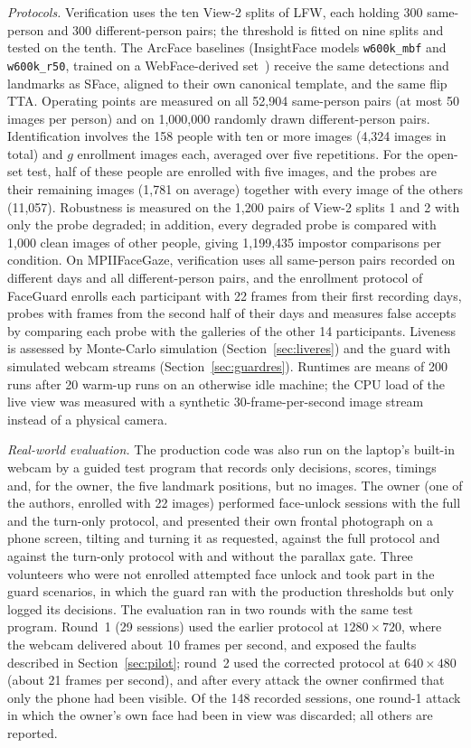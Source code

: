 \documentclass{ieeeaccess}
\begin{document}
\emph{Protocols.} Verification uses the ten View-2 splits of LFW, each holding 300 same-person and 300 different-person pairs; the threshold is fitted on nine splits and tested on the tenth. The ArcFace baselines (InsightFace models \texttt{w600k\_mbf} and \texttt{w600k\_r50}, trained on a WebFace-derived set~\cite{zhu2021webface260m}) receive the same detections and landmarks as SFace, aligned to their own canonical template, and the same flip TTA. Operating points are measured on all 52,904 same-person pairs (at most 50 images per person) and on 1,000,000 randomly drawn different-person pairs. Identification involves the 158 people with ten or more images (4,324 images in total) and $g$ enrollment images each, averaged over five repetitions. For the open-set test, half of these people are enrolled with five images, and the probes are their remaining images (1,781 on average) together with every image of the others (11,057). Robustness is measured on the 1,200 pairs of View-2 splits 1 and 2 with only the probe degraded; in addition, every degraded probe is compared with 1,000 clean images of other people, giving 1,199,435 impostor comparisons per condition. On MPIIFaceGaze, verification uses all same-person pairs recorded on different days and all different-person pairs, and the enrollment protocol of FaceGuard enrolls each participant with 22 frames from their first recording days, probes with frames from the second half of their days and measures false accepts by comparing each probe with the galleries of the other 14 participants. Liveness is assessed by Monte-Carlo simulation (Section~\ref{sec:liveres}) and the guard with simulated webcam streams (Section~\ref{sec:guardres}). Runtimes are means of 200 runs after 20 warm-up runs on an otherwise idle machine; the CPU load of the live view was measured with a synthetic 30-frame-per-second image stream instead of a physical camera.

\emph{Real-world evaluation.} The production code was also run on the laptop's built-in webcam by a guided test program that records only decisions, scores, timings and, for the owner, the five landmark positions, but no images. The owner (one of the authors, enrolled with 22 images) performed face-unlock sessions with the full and the turn-only protocol, and presented their own frontal photograph on a phone screen, tilting and turning it as requested, against the full protocol and against the turn-only protocol with and without the parallax gate. Three volunteers who were not enrolled attempted face unlock and took part in the guard scenarios, in which the guard ran with the production thresholds but only logged its decisions. The evaluation ran in two rounds with the same test program. Round~1 (29 sessions) used the earlier protocol at $1280\times720$, where the webcam delivered about 10 frames per second, and exposed the faults described in Section~\ref{sec:pilot}; round~2 used the corrected protocol at $640\times480$ (about 21 frames per second), and after every attack the owner confirmed that only the phone had been visible. Of the 148 recorded sessions, one round-1 attack in which the owner's own face had been in view was discarded; all others are reported.
\end{document}
